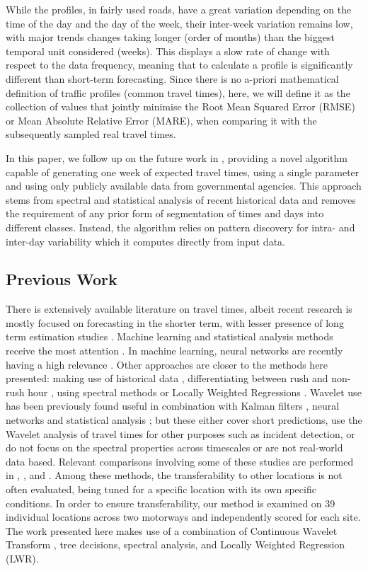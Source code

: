\documentclass[a4paper, 10pt, conference]{ieeeconf}      %
\begin{document}
While the profiles, in fairly used roads, have a great variation depending on the time of the day and the day of the week, their inter-week variation remains low, with major trends changes taking longer (order of months) than the biggest temporal unit considered (weeks). 
This displays a slow rate of change with respect to the data frequency, meaning that to calculate a profile is significantly different than short-term forecasting.
Since there is no a-priori mathematical definition of traffic profiles (common travel times), here, we will define it as the collection of values that jointly minimise the Root Mean Squared Error (RMSE) or Mean Absolute Relative Error (MARE), when comparing it with the subsequently sampled real travel times.

In this paper, we follow up on the future work in \cite{ttprofiles}, providing a novel algorithm capable of generating one week of expected travel times, using a single parameter and using only publicly available data from governmental agencies.
This approach stems from spectral and statistical analysis of recent historical data and removes the requirement of any prior form of segmentation of times and days into different classes. 
Instead, the algorithm relies on pattern discovery for intra- and inter-day variability which it computes directly from input data.
\subsection{Previous Work} \label{Previous Work}
There is extensively available literature on travel times, albeit recent research is mostly focused on forecasting in the shorter term, with lesser presence of long term estimation studies \cite{long-term} \cite{long-term-2}. 
Machine learning and statistical analysis methods receive the most attention \cite{should}. In machine learning, neural networks are recently having a high relevance \cite{NN} \cite{spectral2}.
Other approaches are closer to the methods here presented: making use of historical data \cite{simple} \cite{dynamic-historic}, differentiating between rush and non-rush hour \cite{peak-historic}, using spectral methods \cite{spectral1} or Locally Weighted Regressions \cite{williams} \cite{sun} \cite{zhong} \cite{chowdhury} \cite{acqua} \cite{vana}.
Wavelet use has been previously found useful in combination with Kalman filters \cite{nonlinear}, neural networks \cite{samant} \cite{ghosh} \cite{hojjat} \cite{adeli} and statistical analysis \cite{basu} \cite{hang}; but these either cover short predictions, use the Wavelet analysis of travel times for other purposes such as incident detection, or do not focus on the spectral properties across timescales or are not real-world data based.
Relevant comparisons involving some of these studies are performed in \cite{nikovski}, \cite{lint}, \cite{mori} and \cite{ser}. 
Among these methods, the transferability to other locations is not often evaluated, being tuned for a specific location with its own specific conditions.
In order to ensure transferability, our method is examined on 39 individual locations across two motorways and independently scored for each site.
The work presented here makes use of a combination of Continuous Wavelet Transform \cite{morletwavelet}, tree decisions, spectral analysis, and Locally Weighted Regression (LWR).
\end{document}
